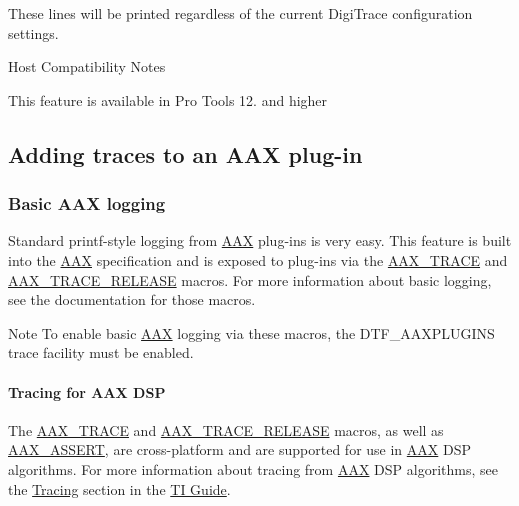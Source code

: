  These lines will be printed regardless of the current Digi\+Trace configuration settings.

\begin{DoxyRefDesc}{Host Compatibility Notes}
\item[\hyperlink{a00380__compatibility_notes000005}{Host Compatibility Notes}]This feature is available in Pro Tools 12. and higher\end{DoxyRefDesc}




 \hypertarget{a00364_digitrace__tracingfromplugins}{}\subsection{Adding traces to an A\+A\+X plug-\/in}\label{a00364_digitrace__tracingfromplugins}
 \hypertarget{a00364_digitrace__tracingfromplugins__basiclogging}{}\subsubsection{Basic A\+A\+X logging}\label{a00364_digitrace__tracingfromplugins__basiclogging}
 Standard {\ttfamily printf}-\/style logging from \hyperlink{a00288}{A\+A\+X} plug-\/ins is very easy. This feature is built into the \hyperlink{a00288}{A\+A\+X} specification and is exposed to plug-\/ins via the \hyperlink{a00158_ab53f1d6a94f8b6ebb3a101f71bfe4e82}{A\+A\+X\+\_\+\+T\+R\+A\+C\+E} and \hyperlink{a00158_ac2aa820ece56bb59140ad561218db4b3}{A\+A\+X\+\_\+\+T\+R\+A\+C\+E\+\_\+\+R\+E\+L\+E\+A\+S\+E} macros. For more information about basic logging, see the documentation for those macros.

 \begin{DoxyNote}{Note}
To enable basic \hyperlink{a00288}{A\+A\+X} logging via these macros, the {\ttfamily D\+T\+F\+\_\+\+A\+A\+X\+P\+L\+U\+G\+I\+N\+S} trace facility must be enabled.
\end{DoxyNote}
\hypertarget{a00364_digitrace__tracingfromplugins__basiclogging__dsp}{}\paragraph{Tracing for A\+A\+X D\+S\+P}\label{a00364_digitrace__tracingfromplugins__basiclogging__dsp}
 The \hyperlink{a00158_ab53f1d6a94f8b6ebb3a101f71bfe4e82}{A\+A\+X\+\_\+\+T\+R\+A\+C\+E} and \hyperlink{a00158_ac2aa820ece56bb59140ad561218db4b3}{A\+A\+X\+\_\+\+T\+R\+A\+C\+E\+\_\+\+R\+E\+L\+E\+A\+S\+E} macros, as well as \hyperlink{a00158_a168ee44fd7a5485ab50160db36fb2988}{A\+A\+X\+\_\+\+A\+S\+S\+E\+R\+T}, are cross-\/platform and are supported for use in \hyperlink{a00288}{A\+A\+X} D\+S\+P algorithms. For more information about tracing from \hyperlink{a00288}{A\+A\+X} D\+S\+P algorithms, see the \hyperlink{a00362_subsection__tracing}{Tracing} section in the \hyperlink{a00362}{T\+I Guide}.

